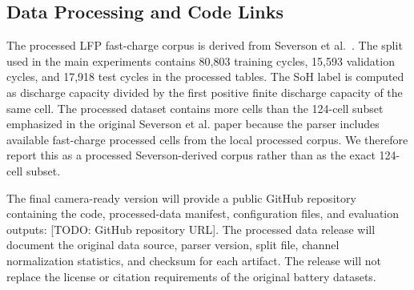 \documentclass[conference]{IEEEtran}
\begin{document}
\subsection{Data Processing and Code Links}
\label{app:data-processing}

The processed LFP fast-charge corpus is derived from Severson
et al.~\cite{severson2019}. The split used in the main experiments contains
80,803 training cycles, 15,593 validation cycles, and 17,918 test cycles in
the processed tables. The SoH label is computed as discharge capacity divided
by the first positive finite discharge capacity of the same cell. The
processed dataset contains more cells than the 124-cell subset emphasized in
the original Severson et al. paper because the parser includes available
fast-charge processed cells from the local processed corpus. We therefore
report this as a processed Severson-derived corpus rather than as the exact
124-cell subset.

The final camera-ready version will provide a public GitHub repository
containing the code, processed-data manifest, configuration files, and
evaluation outputs: [TODO: GitHub repository URL].
The processed data release will document the original data source, parser
version, split file, channel normalization statistics, and checksum for each
artifact. The release will not replace the license or citation requirements
of the original battery datasets.
\end{document}
